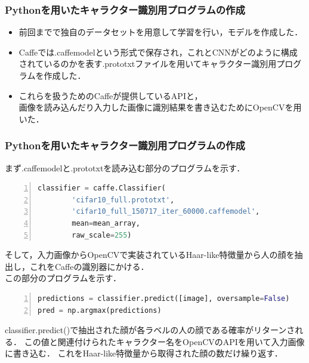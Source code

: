 \documentclass[dvipdfmx,11pt,notheorems]{beamer}
\theoremstyle{definition}
\begin{document}
\begin{frame}\frametitle{Pythonを用いたキャラクター識別用プログラムの作成}
\begin{itemize}
  \item 前回までで独自のデータセットを用意して学習を行い，モデルを作成した．
  \item Caffeでは.caffemodelという形式で保存され，これとCNNがどのように構成されているのかを表す.prototxtファイルを用いてキャラクター識別用プログラムを作成した．
  \item これらを扱うためのCaffeが提供しているAPIと，\\画像を読み込んだり入力した画像に識別結果を書き込むためにOpenCVを用いた．
\end{itemize}
\end{frame}

\begin{frame}[fragile]\frametitle{Pythonを用いたキャラクター識別用プログラムの作成}
まず.caffemodelと.prototxtを読み込む部分のプログラムを示す．

\begin{lstlisting}[basicstyle=\ttfamily\footnotesize, language=Python, frame=single, firstnumber=1, numbers=left, breaklines=true]
classifier = caffe.Classifier(
        'cifar10_full.prototxt',
        'cifar10_full_150717_iter_60000.caffemodel',
        mean=mean_array,
        raw_scale=255)
\end{lstlisting}
そして，入力画像からOpenCVで実装されているHaar-like特徴量から人の顔を抽出し，これをCaffeの識別器にかける．
\\この部分のプログラムを示す．

\begin{lstlisting}[basicstyle=\ttfamily\footnotesize, language=Python, frame=single, firstnumber=1, numbers=left, breaklines=true]
predictions = classifier.predict([image], oversample=False)
pred = np.argmax(predictions)
\end{lstlisting}

classifier.predict()で抽出された顔が各ラベルの人の顔である確率がリターンされる．
この値と関連付けられたキャラクター名をOpenCVのAPIを用いて入力画像に書き込む．
これをHaar-like特徴量から取得された顔の数だけ繰り返す．
\end{frame}
\end{document}
